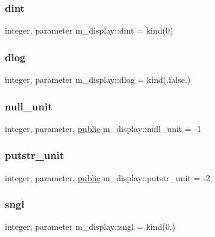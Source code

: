 \subsubsection{\texorpdfstring{dint}{dint}}
{\footnotesize\ttfamily integer, parameter m\+\_\+display\+::dint = kind(0)\hspace{0.3cm}{\ttfamily [private]}}

\mbox{\label{namespacem__display_a8c6a3df510feabf6bc84dd0a8789f98c}} 
\subsubsection{\texorpdfstring{dlog}{dlog}}
{\footnotesize\ttfamily integer, parameter m\+\_\+display\+::dlog = kind(.false.)\hspace{0.3cm}{\ttfamily [private]}}

\mbox{\label{namespacem__display_a19eab1ae2710aecb5e6db7c68152d645}} 
\subsubsection{\texorpdfstring{null\+\_\+unit}{null\_unit}}
{\footnotesize\ttfamily integer, parameter, \hyperlink{M__stopwatch_83_8txt_a2f74811300c361e53b430611a7d1769f}{public} m\+\_\+display\+::null\+\_\+unit = -\/1}

\mbox{\label{namespacem__display_a3d9e3532ee7c52476b1d1545b2f73d89}} 
\subsubsection{\texorpdfstring{putstr\+\_\+unit}{putstr\_unit}}
{\footnotesize\ttfamily integer, parameter, \hyperlink{M__stopwatch_83_8txt_a2f74811300c361e53b430611a7d1769f}{public} m\+\_\+display\+::putstr\+\_\+unit = -\/2}

\mbox{\label{namespacem__display_a2ac86bc535c3ccc5947dbb3109c666b5}} 
\subsubsection{\texorpdfstring{sngl}{sngl}}
{\footnotesize\ttfamily integer, parameter m\+\_\+display\+::sngl = kind(0.)\hspace{0.3cm}{\ttfamily [private]}}

